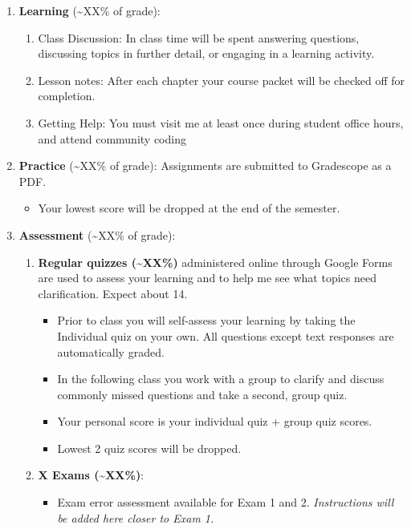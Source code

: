 \documentclass[
]{article}
\providecommand{\tightlist}{%
  \setlength{\itemsep}{0pt}\setlength{\parskip}{0pt}}
\begin{document}
\begin{enumerate}
\def\labelenumi{\arabic{enumi}.}
\tightlist
\item
  \textbf{Learning} (\textasciitilde XX\% of grade):

  \begin{enumerate}
  \def\labelenumii{\alph{enumii}.}
  \tightlist
  \item
    Class Discussion: In class time will be spent answering questions,
    discussing topics in further detail, or engaging in a learning
    activity.
  \item
    Lesson notes: After each chapter your course packet will be checked
    off for completion.
  \item
    Getting Help: You must visit me at least once during student office
    hours, and attend community coding
  \end{enumerate}
\item
  \textbf{Practice} (\textasciitilde XX\% of grade): Assignments are
  submitted to Gradescope as a PDF.

  \begin{itemize}
  \tightlist
  \item
    Your lowest score will be dropped at the end of the semester.
  \end{itemize}
\item
  \textbf{Assessment} (\textasciitilde XX\% of grade):

  \begin{enumerate}
  \def\labelenumii{\alph{enumii}.}
  \item
    \textbf{Regular quizzes (\textasciitilde XX\%)} administered online
    through Google Forms are used to assess your learning and to help me
    see what topics need clarification. Expect about 14.

    \begin{itemize}
    \tightlist
    \item
      Prior to class you will self-assess your learning by taking the
      Individual quiz on your own. All questions except text responses
      are automatically graded.
    \item
      In the following class you work with a group to clarify and
      discuss commonly missed questions and take a second, group quiz.
    \item
      Your personal score is your individual quiz + group quiz scores.
    \item
      Lowest 2 quiz scores will be dropped.
    \end{itemize}
  \item
    \textbf{X Exams (\textasciitilde XX\%)}:

    \begin{itemize}
    \tightlist
    \item
      Exam error assessment available for Exam 1 and 2.
      \emph{Instructions will be added here closer to Exam 1.}
    \end{itemize}
  \end{enumerate}
\end{enumerate}
\end{document}
